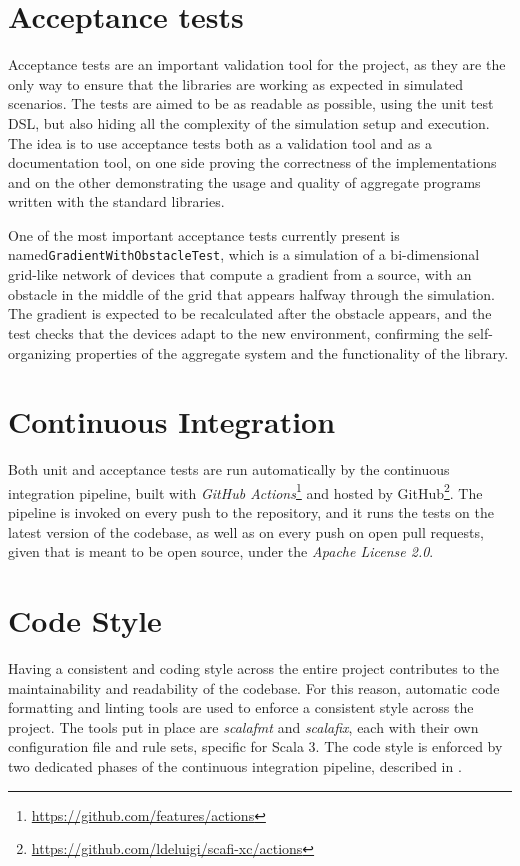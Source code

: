 \section{Acceptance tests}

Acceptance tests are an important validation tool for the project, as they are the only way to ensure that the libraries are working as expected in simulated scenarios.
%
The tests are aimed to be as readable as possible, using the unit test \ac{DSL}, but also hiding all the complexity of the simulation setup and execution.
%
The idea is to use acceptance tests both as a validation tool and as a documentation tool, on one side proving the correctness of the implementations and on the other demonstrating the usage and quality of aggregate programs written with the standard libraries.

One of the most important acceptance tests currently present is named\linebreak\texttt{GradientWithObstacleTest}, which is a simulation of a bi-dimensional grid-like network of devices that compute a gradient from a source, with an obstacle in the middle of the grid that appears halfway through the simulation.
%
The gradient is expected to be recalculated after the obstacle appears, and the test checks that the devices adapt to the new environment, confirming the self-organizing properties of the aggregate system and the functionality of the library.


\section{Continuous Integration} \label{chap:evaluation->sec:continuous-integration}

Both unit and acceptance tests are run automatically by the continuous integration pipeline, built with \textit{GitHub Actions}\footnote{\url{https://github.com/features/actions}} and hosted by GitHub\footnote{\url{https://github.com/ldeluigi/scafi-xc/actions}}.
%
The pipeline is invoked on every push to the repository, and it runs the tests on the latest version of the codebase, as well as on every push on open pull requests, given that \this is meant to be open source, under the \textit{Apache License 2.0}.


\section{Code Style} \label{chap:evaluation->sec:code-style}

Having a consistent and  coding style across the entire project contributes to the maintainability and readability of the codebase.
%
For this reason, automatic code formatting and linting tools are used to enforce a consistent style across the project.
%
The tools put in place are \textit{scalafmt} and \textit{scalafix}, each with their own configuration file and rule sets, specific for Scala 3.
%
The code style is enforced by two dedicated phases of the continuous integration pipeline, described in .
